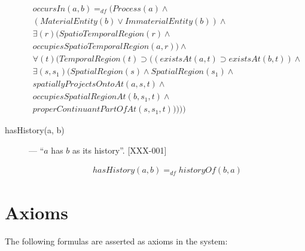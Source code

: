 \documentclass{article}
\newcommand{\DF}{\ensuremath{=_{df}}}
\begin{document}
\begin{description}
\begin{equation}
\begin{split}
occursIn(a, b) \DF (Process(a) \wedge \\
(MaterialEntity(b) \vee ImmaterialEntity(b)) \wedge \\
{\exists}(r)(SpatioTemporalRegion(r) \wedge \\
occupiesSpatioTemporalRegion(a, r)) \wedge \\
{\forall}(t)(TemporalRegion(t) \supset ((existsAt(a, t) \supset existsAt(b, t)) \wedge \\
{\exists}(s, s_1)(SpatialRegion(s) \wedge SpatialRegion(s_1) \wedge \\
spatiallyProjectsOntoAt(a, s, t) \wedge \\
occupiesSpatialRegionAt(b, s_1, t) \wedge \\
properContinuantPartOfAt(s, s_1, t)))))
\end{split}
\end{equation}


\item[hasHistory(a, b)] --- ``$a$ has $b$ as its history''. [XXX-001]

\begin{equation}
\begin{split}
hasHistory(a, b) \DF historyOf(b, a)
\end{split}
\end{equation}

\end{description}





\section{Axioms}

The following formulas are asserted as axioms in the system:
\end{document}
